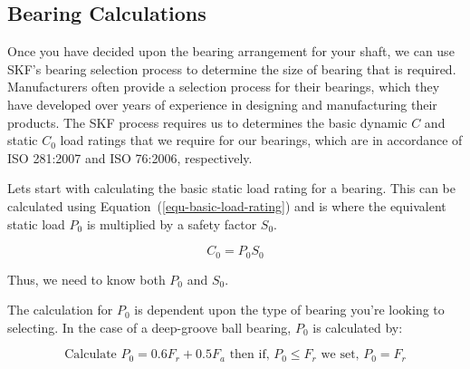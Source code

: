 






\subsection{Bearing Calculations} 

Once you have decided upon the bearing arrangement for your shaft, we can use SKF's bearing selection process to determine the size of bearing that is required. Manufacturers often provide a selection process for their bearings, which they have developed over years of experience in designing and manufacturing their products. The SKF process requires us to determines the basic dynamic \(C\) and static \(C_0\) load ratings that we require for our bearings, which are in accordance of ISO 281:2007 and ISO 76:2006, respectively.


Lets  start with calculating the basic static load rating for a bearing. This can be calculated using Equation~(\ref{equ-basic-load-rating}) and is where the equivalent static load \(P_0\) is multiplied by a safety factor \(S_0\).

\begin{equation}
    C_0 = P_0 S_0
    \label{equ-basic-load-rating}
\end{equation}

Thus, we need to know both \(P_0\) and \(S_0\).

The calculation for \(P_0\) is dependent upon the type of bearing you're looking to selecting. In the case of a deep-groove ball bearing, \(P_0\) is calculated by:

\begin{equation}
    \text{Calculate } P_0 = 0.6F_r+0.5F_a \text{ then if, } P_0 \le F_r \text{ we set, }P_0 = F_r
\end{equation}


